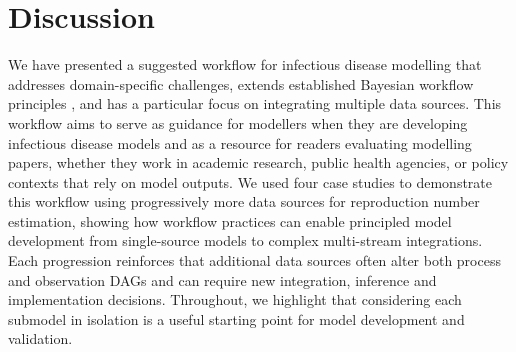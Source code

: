 \documentclass{article}
\begin{document}
\section{Discussion}


We have presented a suggested workflow for infectious disease modelling that addresses domain-specific challenges, extends established Bayesian workflow principles \citep{green2003highly,gelman2020bayesian}, and has a particular focus on integrating multiple data sources.
This workflow aims to serve as guidance for modellers when they are developing infectious disease models and as a resource for readers evaluating modelling papers, whether they work in academic research, public health agencies, or policy contexts that rely on model outputs.
We used four case studies to demonstrate this workflow using progressively more data sources for reproduction number estimation, showing how workflow practices can enable principled model development from single-source models to complex multi-stream integrations.
Each progression reinforces that additional data sources often alter both process and observation \ac{DAG}s and can require new integration, inference and implementation decisions.
Throughout, we highlight that considering each submodel in isolation is a useful starting point for model development and validation.

\end{document}
